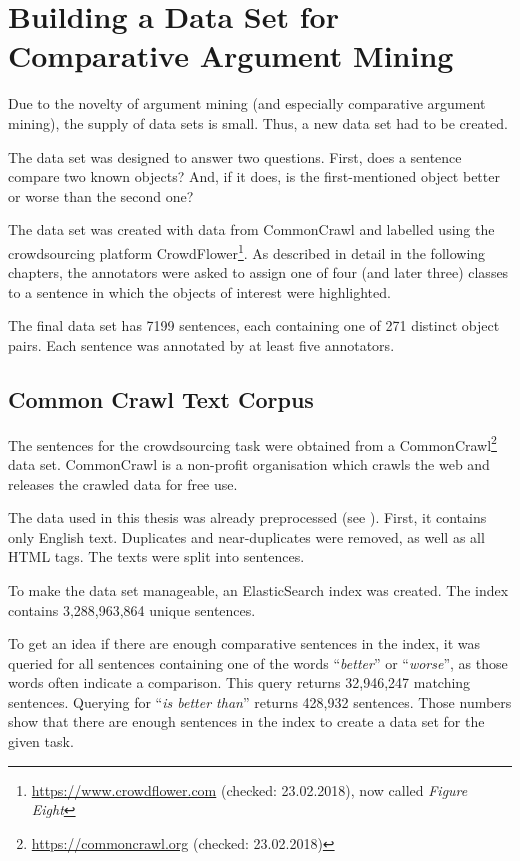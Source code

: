 \FloatBarrier
\chapter{Building a Data Set for Comparative Argument Mining}
\label{sec:prestudy}
Due to the novelty of argument mining (and especially comparative argument mining), the supply of data sets is small. Thus, a new data set had to be created.

The data set was designed to answer two questions. First, does a sentence compare two known objects? And, if it does, is the first-mentioned object better or worse than the second one?

The data set was created with data from CommonCrawl and labelled using the crowdsourcing platform CrowdFlower\footnote{\url{https://www.crowdflower.com} (checked: 23.02.2018), now called \emph{Figure Eight}}. As described in detail in the following chapters, the annotators were asked to assign one of four (and later three) classes to a sentence in which the objects of interest were highlighted.

The final data set has 7199 sentences, each containing one of 271 distinct object pairs. Each sentence was annotated by at least five annotators.

\section{Common Crawl Text Corpus}
The sentences for the crowdsourcing task were obtained from a CommonCrawl\footnote{\url{https://commoncrawl.org} (checked: 23.02.2018)} data set. CommonCrawl is a non-profit organisation which crawls the web and releases the crawled data for free use.

The data used in this thesis was already preprocessed (see \cite{Panchenko:2017aa}). First, it contains only English text. Duplicates and near-duplicates were removed, as well as all HTML tags. The texts were split into sentences.

To make the data set manageable, an ElasticSearch index was created. The index contains 3,288,963,864 unique sentences.

To get an idea if there are enough comparative sentences in the index, it was queried for all sentences containing one of the words \enquote{\emph{better}} or \enquote{\emph{worse}},  as those words often indicate a comparison. This query returns 32,946,247 matching sentences. Querying for \enquote{\emph{is better than}} returns 428,932 sentences. Those numbers show that there are enough sentences in the index to create a data set for the given task.


